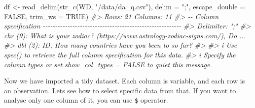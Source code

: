 \documentclass[
]{article}
\newenvironment{Shaded}{\begin{snugshade}}{\end{snugshade}}
\newcommand{\AttributeTok}[1]{\textcolor[rgb]{0.77,0.63,0.00}{#1}}
\newcommand{\CommentTok}[1]{\textcolor[rgb]{0.56,0.35,0.01}{\textit{#1}}}
\newcommand{\ConstantTok}[1]{\textcolor[rgb]{0.00,0.00,0.00}{#1}}
\newcommand{\FunctionTok}[1]{\textcolor[rgb]{0.00,0.00,0.00}{#1}}
\newcommand{\NormalTok}[1]{#1}
\newcommand{\OtherTok}[1]{\textcolor[rgb]{0.56,0.35,0.01}{#1}}
\newcommand{\StringTok}[1]{\textcolor[rgb]{0.31,0.60,0.02}{#1}}
\begin{document}
\begin{Shaded}
\begin{Highlighting}[]
\NormalTok{df }\OtherTok{\textless{}{-}} \FunctionTok{read\_delim}\NormalTok{(}\FunctionTok{str\_c}\NormalTok{(WD, }\StringTok{"/data/da\_q.csv"}\NormalTok{), }\AttributeTok{delim =} \StringTok{";"}\NormalTok{, }\AttributeTok{escape\_double =} \ConstantTok{FALSE}\NormalTok{, }\AttributeTok{trim\_ws =} \ConstantTok{TRUE}\NormalTok{)}
\CommentTok{\#\textgreater{} Rows: 21 Columns: 11}
\CommentTok{\#\textgreater{} {-}{-} Column specification {-}{-}{-}{-}{-}{-}{-}{-}{-}{-}{-}{-}{-}{-}{-}{-}{-}{-}{-}{-}{-}{-}{-}{-}{-}{-}{-}{-}{-}{-}{-}{-}{-}{-}{-}{-}{-}{-}{-}{-}{-}{-}{-}{-}{-}{-}{-}{-}{-}{-}{-}{-}{-}{-}{-}{-}}
\CommentTok{\#\textgreater{} Delimiter: ";"}
\CommentTok{\#\textgreater{} chr (9): What is your zodiac? (https://www.astrology{-}zodiac{-}signs.com/), Do ...}
\CommentTok{\#\textgreater{} dbl (2): ID, How many countries have you been to so far?}
\CommentTok{\#\textgreater{} }
\CommentTok{\#\textgreater{} i Use \textasciigrave{}spec()\textasciigrave{} to retrieve the full column specification for this data.}
\CommentTok{\#\textgreater{} i Specify the column types or set \textasciigrave{}show\_col\_types = FALSE\textasciigrave{} to quiet this message.}
\end{Highlighting}
\end{Shaded}

Now we have imported a tidy dataset. Each column is variable, and each row is an observation. Lets see how to select specific data from that. If you want to analyse only one column of it, you can use \texttt{\$} operator.
\end{document}
